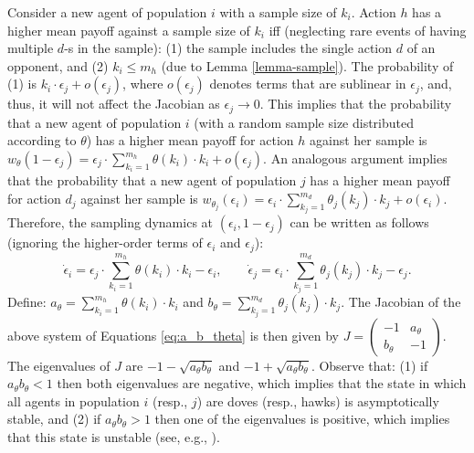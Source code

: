 \documentclass[12pt]{article}
\numberwithin{equation}{section}
\numberwithin{figure}{section}
\theoremstyle{definition}
\theoremstyle{plain}
\theoremstyle{plain}
\theoremstyle{plain}
\theoremstyle{remark}
\theoremstyle{plain}
\theoremstyle{plain}
\begin{document}
 Consider a new agent of population
$i$ with a sample size of $k_{i}.$ Action $h$ has a higher mean
payoff against a sample size of $k_{i}$ iff (neglecting rare events
of having multiple $d$-s in the sample): (1) the sample includes the single action $d$ of an opponent, and (2) $k_{i}\leq m_{h}$
 (due to Lemma \ref{lemma-sample}). The probability of (1) is $k_{i}\cdot\epsilon_{j}+o(\epsilon_{j})$,
where $o(\epsilon_{j})$ denotes terms that are sublinear in $\epsilon_{j}$,
and, thus, it will not affect the Jacobian as $\epsilon_{j}\rightarrow0$.
This implies that the probability that a new agent of population $i$
(with a random sample size distributed according to $\theta$)
has a higher mean payoff for action $h$ against her sample is
$w_{\theta}(1-\epsilon_{j})=\epsilon_{j}\cdot\sum_{k_{i}=1}^{m_{h}}\theta(k_i)\cdot k_{i}+o(\epsilon_{j})$.
An analogous argument implies that the probability that a new agent
of population $j$ has a higher mean payoff for action $d_{j}$ against
her sample is $w_{\theta_{j}}(\epsilon_{i})=\epsilon_{i}\cdot\sum_{k_{j}=1}^{m_{d}}\theta_{j}(k_j)\cdot k_{j}+o(\epsilon_{i})$.
Therefore, the sampling dynamics at $(\epsilon_{i},1-\epsilon_{j})$
can be written as follows (ignoring the higher-order terms
of $\epsilon_{i}$ and $\epsilon_{j}$):
\begin{equation}
\dot{\epsilon}_{i}=\epsilon_{j}\cdot\sum_{k_{i}=1}^{m_{h}}\theta(k_i)\cdot k_{i}-\epsilon_{i},\,\,\,\,\,\,\,\,\,\,\,\,\dot{\epsilon}_{j}=\epsilon_{i}\cdot\sum_{k_{j}=1}^{m_{d}}\theta_{j}(k_j)\cdot k_{j}-\epsilon_{j}.\label{eq:a_b_theta}
\end{equation}
Define: $a_{\theta}=\sum_{k_{i}=1}^{m_{h}}\theta(k_i)\cdot k_{i}$
and $b_{\theta}=\sum_{k_{j}=1}^{m_{d}}\theta_{j}(k_j)\cdot k_{j}$.
The Jacobian of the above system of Equations \eqref{eq:a_b_theta}
is then given by $J=\left(\begin{array}{cc}
-1 & a_{\theta}\\
b_{\theta} & -1
\end{array}\right).$ The eigenvalues of $J$ are $-1-\sqrt{a_{\theta}b_{\theta}}$
and $-1+\sqrt{a_{\theta}b_{\theta}}.$ Observe that:
(1) if $a_{\theta}b_{\theta}<1$ then both eigenvalues
are negative, which implies that the state in which
all agents in population $i$ (resp., $j$) are doves (resp., hawks) is asymptotically
stable, and (2) if $a_{\theta}b_{\theta}>1$ then
one of the eigenvalues is positive, which implies that this state is unstable (see, e.g., \citealp[Theorems 1--2 in Section 2.9]{perko2013differential}).

\end{document}
